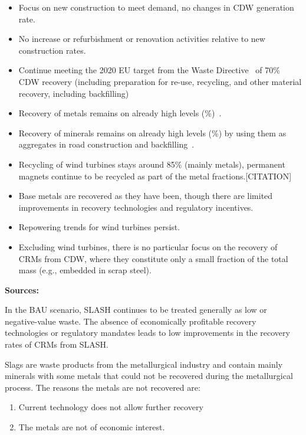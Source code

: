\begin{itemize}
  \item Focus on new construction to meet demand, no changes in CDW generation rate.
  \item No increase or refurbishment or renovation activities relative to new construction rates.
  \item Continue meeting the 2020 EU target from the Waste Directive~\cite{eu2008wastedirective} of 70\% CDW recovery (including preparation for re-use, recycling, and other material recovery, including backfilling)
  \item Recovery of metals remains on already high levels (\%)~\cite{moschen2023cdw}.
  \item Recovery of minerals remains on already high levels (\%) by using them as aggregates in road construction and backfilling~\cite{moschen2023cdw}.
  \item Recycling of wind turbines stays around 85\% (mainly metals), permanent magnets continue to be recycled as part of the metal fractions.[CITATION]
  \item Base metals are recovered as they have been, though there are limited improvements in recovery technologies and regulatory incentives.
  \item Repowering trends for wind turbines persist.
  \item Excluding wind turbines, there is no particular focus on the recovery of CRMs from CDW, where they constitute only a small fraction of the total mass (e.g., embedded in scrap steel).
\end{itemize}



\wasteSubsubsecSLASH 
\textbf{Sources:}~\cite{eurofer2023steel,euroal2023aluminium,vogl2020steelgreen,visualcapitalist2023steel,asquer2019ash}

In the BAU scenario, SLASH continues to be treated generally as low or negative-value waste. The absence of economically profitable recovery technologies or regulatory mandates leads to low improvements in the recovery rates of CRMs from SLASH.


Slags are waste products from the metallurgical industry and contain mainly minerals with some metals that could not be recovered during the metallurgical process. The reasons the metals are not recovered are:

\begin{enumerate}
  \item Current technology does not allow further recovery
  \item The metals are not of economic interest.
\end{enumerate}


